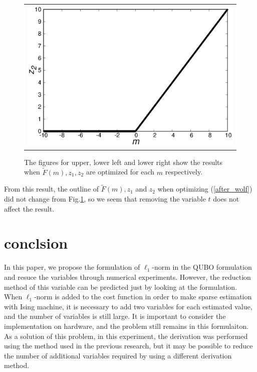 \documentclass[fp,twocolumn]{jpsj3}
\begin{document}
\begin{figure}[htbp]
\begin{center}
\begin{tabular}{c}
\begin{minipage}{0.50\hsize}
        \includegraphics[keepaspectratio,scale=0.33]{minimum_z2_non_t.eps}
      \end{minipage}
    \end{tabular}
    \caption{The figures for upper, lower left and lower right show the results when $\widetilde{F}(m), z_{1}, z_{2}$ are optimized for each $m$ respectively.}
    \label{fig:minimum2}
  \end{center}
\end{figure}
From this result, the outline of $\widetilde{F}(m), z_{1}$ and $z_{2}$ when optimizing (\ref{after_wolf}) did not change from Fig.\ref{fig:minimum2}, so we seem that removing the variable $t$ does not affect the result.


\section{conclsion}
In this paper, we propose the formulation of $\ell_{1}$-norm in the QUBO formulation and resuce the variables through numerical experiments. However, the reduction method of this variable can be predicted just by looking at the formulation. When $\ell_{1}$-norm is added to the cost function in order to make sparse estimation with Ising machine, it is necessary to add two variables for each estimated value, and the number of variables is still large. It is important to consider the implementation on hardware, and the problem still remains in this formulaiton. As a solution of this problem, in this experiment, the derivation was performed using the method used in the previous research, but it may be possible to reduce the number of additional variables required by using a different derivation method.
\end{document}
